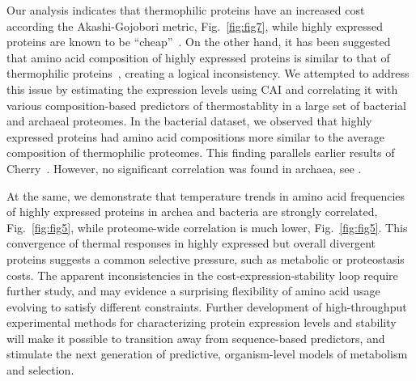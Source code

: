\documentclass[10pt,letterpaper]{article}
\begin{document}
Our analysis indicates that thermophilic proteins have an increased cost according the Akashi-Gojobori metric, Fig.~\ref{fig:fig7}, while highly expressed proteins are known to be ``cheap''~\cite{Akashi2002Metabolic}. On the other hand, it has been suggested that amino acid composition of highly expressed proteins is similar to that of thermophilic proteins~\cite{Cherry2010Highly}, creating a logical inconsistency. We attempted to address this issue by estimating the expression levels using CAI and correlating it with various composition-based predictors of thermostablity in a large set of bacterial and archaeal proteomes. In the bacterial dataset, we observed that highly expressed proteins had amino acid compositions more similar to the average composition of thermophilic proteomes. This finding parallels earlier results of Cherry~\cite{Cherry2010Highly}. However, no significant correlation was found in archaea, see . 

At the same, we demonstrate that temperature trends in amino acid frequencies of highly expressed proteins in archea and bacteria are strongly correlated, Fig.~\ref{fig:fig5}, while proteome-wide correlation is much lower, Fig.~\ref{fig:fig5}. This convergence of thermal responses in highly expressed but overall divergent proteins suggests a common selective pressure, such as metabolic or proteostasis costs. The apparent inconsistencies in the cost-expression-stability loop require further study, and may evidence a surprising flexibility of amino acid usage evolving to satisfy different constraints. Further development of high-throughput experimental methods for characterizing protein expression levels and stability will make it possible to transition away from sequence-based predictors, and stimulate the next generation of predictive, organism-level models of metabolism and selection.



\end{document}
